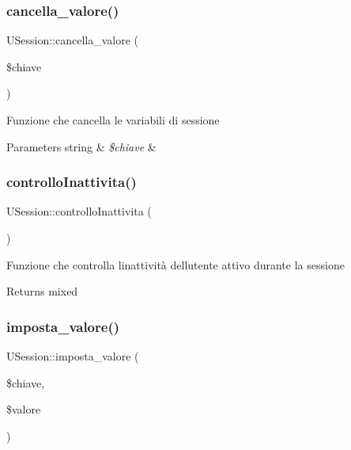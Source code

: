 \subsubsection{\texorpdfstring{cancella\+\_\+valore()}{cancella\_valore()}}
{\footnotesize\ttfamily U\+Session\+::cancella\+\_\+valore (\begin{DoxyParamCaption}\item[{}]{\$chiave }\end{DoxyParamCaption})}

Funzione che cancella le variabili di sessione


\begin{DoxyParams}[1]{Parameters}
string & {\em \$chiave} & \\
\hline
\end{DoxyParams}
\mbox{\label{class_u_session_a4fa4bb16e229791f09ece2af558a0549}} 
\subsubsection{\texorpdfstring{controllo\+Inattivita()}{controlloInattivita()}}
{\footnotesize\ttfamily U\+Session\+::controllo\+Inattivita (\begin{DoxyParamCaption}{ }\end{DoxyParamCaption})}

Funzione che controlla l\textquotesingle{}inattività dell\textquotesingle{}utente attivo durante la sessione

\begin{DoxyReturn}{Returns}
mixed 
\end{DoxyReturn}
\mbox{\label{class_u_session_a213a0df57361fd27ce1d2db70984231a}} 
\subsubsection{\texorpdfstring{imposta\+\_\+valore()}{imposta\_valore()}}
{\footnotesize\ttfamily U\+Session\+::imposta\+\_\+valore (\begin{DoxyParamCaption}\item[{}]{\$chiave,  }\item[{}]{\$valore }\end{DoxyParamCaption})}

